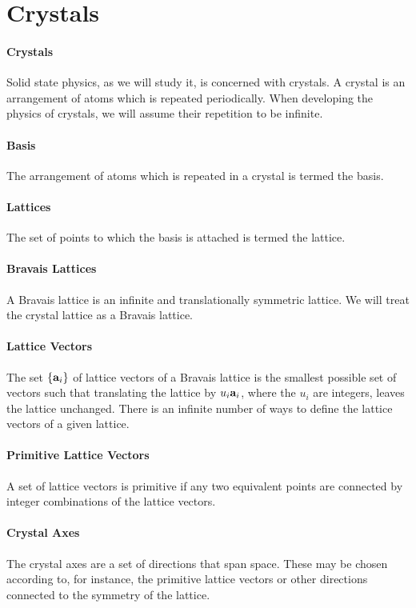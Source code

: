 \section{Crystals}

\paragraph{Crystals}
Solid state physics, as we will study it, is concerned with crystals. A crystal is an arrangement of atoms which is repeated periodically. When developing the physics of crystals, we will assume their repetition to be infinite.

\paragraph{Basis}
The arrangement of atoms which is repeated in a crystal is termed the basis.

\paragraph{Lattices}
The set of points to which the basis is attached is termed the lattice.

\paragraph{Bravais Lattices}
A Bravais lattice is an infinite and translationally symmetric lattice. We will treat the crystal lattice as a Bravais lattice.

\paragraph{Lattice Vectors}
The set $\{\vb{a}_{i}\}$ of lattice vectors of a Bravais lattice is the smallest possible set of vectors such that translating the lattice by $u_{i}\vb{a}_{i}$, where the $u_{i}$ are integers, leaves the lattice unchanged. There is an infinite number of ways to define the lattice vectors of a given lattice.

\paragraph{Primitive Lattice Vectors}
A set of lattice vectors is primitive if any two equivalent points are connected by integer combinations of the lattice vectors.

\paragraph{Crystal Axes}
The crystal axes are a set of directions that span space. These may be chosen according to, for instance, the primitive lattice vectors or other directions connected to the symmetry of the lattice.

